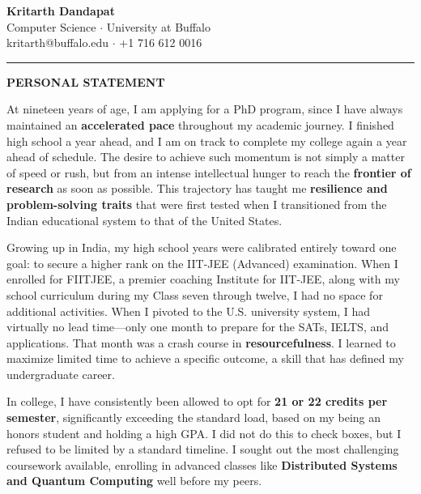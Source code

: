\documentclass[12pt, letterpaper]{article}
\begin{document}
\begin{center}
    \textbf{\Large Kritarth Dandapat } \\ \vspace{4pt}
    Computer Science $\cdot$ University at Buffalo \\
    kritarth@buffalo.edu $\cdot$ +1 716 612 0016 \\ \vspace{4pt}
\end{center}

\vspace{0.5em}
\hrule
\vspace{1.5em}

\begin{center}
    \textbf{\Large PERSONAL STATEMENT}
\end{center}
\vspace{1em}

At nineteen years of age, I am applying for a PhD program, since I have always maintained an \textbf{accelerated pace} throughout my academic journey. I finished high school a year ahead, and I am on track to complete my college again a year ahead of schedule. The desire to achieve such momentum is not simply a matter of speed or rush, but from an intense intellectual hunger to reach the \textbf{frontier of research} as soon as possible. This trajectory has taught me \textbf{resilience and problem-solving traits} that were first tested when I transitioned from the Indian educational system to that of the United States.

Growing up in India, my high school years were calibrated entirely toward one goal: to secure a higher rank on the IIT-JEE (Advanced) examination. When I enrolled for FIITJEE, a premier coaching Institute for IIT-JEE, along with my school curriculum during my Class seven through twelve, I had no space for additional activities. When I pivoted to the U.S. university system, I had virtually no lead time---only one month to prepare for the SATs, IELTS, and applications. That month was a crash course in \textbf{resourcefulness}. I learned to maximize limited time to achieve a specific outcome, a skill that has defined my undergraduate career.

In college, I have consistently been allowed to opt for \textbf{21 or 22 credits per semester}, significantly exceeding the standard load, based on my being an honors student and holding a high GPA. I did not do this to check boxes, but I refused to be limited by a standard timeline. I sought out the most challenging coursework available, enrolling in advanced classes like \textbf{Distributed Systems and Quantum Computing} well before my peers.
\end{document}
